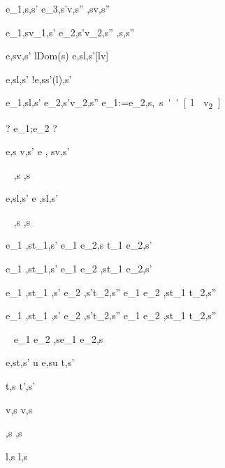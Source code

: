   {e_1,s\evaluate \False,s' \Quad
   e_3,s'\evaluate v,s''}
  {,s\evaluate v,s''}


  {e_1,s\evaluate v_1,s' \Quad
   e_2,s'\evaluate v_2,s''}
  {,s\evaluate{},s''}


  {e,s\evaluate v,s' \Quad
   l\not\in Dom(s)}
  {\Ref e,s\evaluate l,s'[l\mapsto v]}

  {e,s\evaluate l,s'}
  {!e,s\evaluate s'(l),s'}

  {e_1,s\evaluate l,s' \Quad
   e_2,s'\evaluate v_2,s''}
  {e_1:=e_2,s\evaluate \unit,s''[l\mapsto v_2]}


  {?}
  {e_1;e_2 \evaluate ?}

  {e,s \evaluate v,s'}
  {\Edit e , s\evaluate \Edit v,s'}

  {\ }
  {\Enter \tau,s \evaluate \Enter \tau,s}

  {e,s\evaluate l,s'}
  {\Update e ,s\evaluate \Update l,s'}


  {\ }
  {\Fail,s \evaluate \Fail,s}


  {e_1 ,s\evaluate t_1,s'}
  {e_1 \Then e_2,s \evaluate t_1 \Then e_2,s'}

  {e_1 ,s\evaluate t_1,s'}
  {e_1 \Next e_2 ,s\evaluate t_1 \Next e_2,s'}


  {
    {e_1 ,s\evaluate t_1 ,s'}
    {e_2 ,s'\evaluate t_2,s''}}
  {e_1 \And e_2 ,s\evaluate t_1 \And t_2,s''}


  {
    {e_1 ,s\evaluate t_1 ,s'}
    {e_2 ,s'\evaluate t_2,s''}}
  {e_1 \Or e_2 ,s\evaluate t_1 \Or t_2,s''}

  {\ }
  {e_1 \Xor e_2 ,s\evaluate e_1 \Xor e_2,s}


    {e,s\evaluate t,s'}
    {u \At e,s\evaluate u \At t,s'}





  {t,s \stride t',s'}


  { }
  {\Edit v,s \stride \Edit v,s}

  { }
  {\Enter \tau,s \stride \Enter \tau,s}

  { }
  {\Update l,s \stride \Update l,s}


